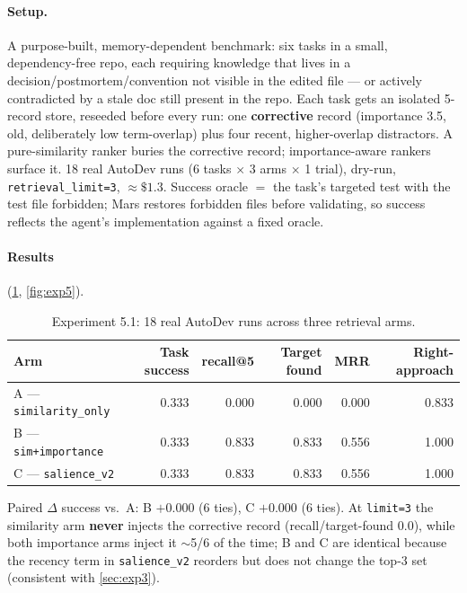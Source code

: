 \documentclass[11pt]{article}
\begin{document}
\paragraph{Setup.} A purpose-built, memory-dependent benchmark: six tasks in a small,
dependency-free repo, each requiring knowledge that lives in a decision/postmortem/convention
not visible in the edited file --- or actively contradicted by a stale doc still present in
the repo. Each task gets an isolated 5-record store, reseeded before every run: one
\textbf{corrective} record (importance 3.5, old, deliberately low term-overlap) plus four
recent, higher-overlap distractors. A pure-similarity ranker buries the corrective record;
importance-aware rankers surface it. 18 real AutoDev runs (6 tasks $\times$ 3 arms $\times$
1 trial), dry-run, \texttt{retrieval\_limit=3}, $\approx\$1.3$. Success oracle $=$ the
task's targeted test with the test file forbidden; Mars restores forbidden files before
validating, so success reflects the agent's implementation against a fixed oracle.

\paragraph{Results} (\cref{tab:exp5}, \cref{fig:exp5}).

\begin{table}[h]
\centering
\caption{Experiment 5.1: 18 real AutoDev runs across three retrieval arms.}
\label{tab:exp5}
\begin{tabular}{lrrrrr}
\toprule
Arm & Task success & recall@5 & Target found & MRR & Right-approach \\
\midrule
A --- \texttt{similarity\_only} & 0.333 & 0.000 & 0.000 & 0.000 & 0.833 \\
B --- \texttt{sim+importance} & 0.333 & 0.833 & 0.833 & 0.556 & 1.000 \\
C --- \texttt{salience\_v2} & 0.333 & 0.833 & 0.833 & 0.556 & 1.000 \\
\bottomrule
\end{tabular}
\end{table}

Paired $\Delta$ success vs.\ A: B $+0.000$ (6 ties), C $+0.000$ (6 ties). At
\texttt{limit=3} the similarity arm \textbf{never} injects the corrective record
(recall/target-found $0.0$), while both importance arms inject it $\sim$5/6 of the time; B
and C are identical because the recency term in \texttt{salience\_v2} reorders but does not
change the top-3 set (consistent with \cref{sec:exp3}).
\end{document}
